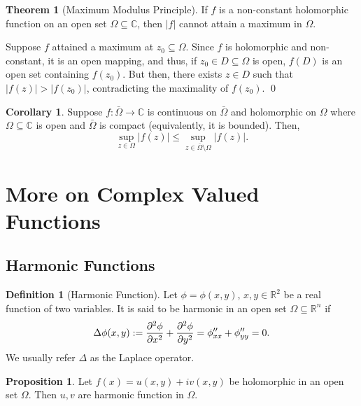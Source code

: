 \documentclass[
]{article}
\theoremstyle{definition}
\newtheorem{theorem}{Theorem}
\newtheorem{prop}{Proposition}
\newtheorem{corollary}{Corollary}[theorem]
\theoremstyle{definition}
\newtheorem{definition}{Definition}[section]
\begin{document}
\begin{theorem}[Maximum Modulus Principle]
  If \(f\) is a non-constant holomorphic function on an open set \(\Omega \subseteq \mathbb{C}\), 
  then \(|f|\) cannot attain a maximum in \(\Omega\).
\end{theorem}
\proof

Suppose \(f\) attained a maximum at \(z_0 \subseteq \Omega\). Since
\(f\) is holomorphic and non-constant, it is an open mapping, and thus,
if \(z_0 \in D \subseteq \Omega\) is open, \(f(D)\) is an open set
containing \(f(z_0)\). But then, there exists \(z \in D\) such that
\(|f(z)| > |f(z_0)|\), contradicting the maximality of \(f(z_0)\). \qed

\begin{corollary}
  Suppose \(f : \bar \Omega \to \mathbb{C}\) is continuous on \(\bar \Omega\) 
  and holomorphic on \(\Omega\) where \(\Omega \subseteq \mathbb{C}\) is open 
  and \(\bar \Omega\) is compact (equivalently, it is bounded). 
  Then, 
  \[\sup_{z \in \Omega}|f(z)| \le \sup_{z \in \bar \Omega \setminus \Omega} |f(z)|.\]
\end{corollary}

\newpage

\hypertarget{more-on-complex-valued-functions}{%
\section{More on Complex Valued
Functions}\label{more-on-complex-valued-functions}}

\hypertarget{harmonic-functions}{%
\subsection{Harmonic Functions}\label{harmonic-functions}}

\begin{definition}[Harmonic Function]
  Let \(\phi = \phi(x, y)\), \(x, y \in \mathbb{R}^2\) be a real function of two 
  variables. It is said to be harmonic in an open set \(\Omega \subseteq \mathbb{R}^n\) 
  if 
  \[\Delta \phi(x, y) := \pdv[2]{\phi}{x} + \pdv[2]{\phi}{y} = 
    \phi''_{xx} + \phi''_{yy} = 0.\]
  We usually refer \(\Delta\) as the Laplace operator.
\end{definition}

\begin{prop}
  Let \(f(x) = u(x, y) + iv(x, y)\) be holomorphic in an open set \(\Omega\). 
  Then \(u, v\) are harmonic function in \(\Omega\).
\end{prop}
\proof
\end{document}
